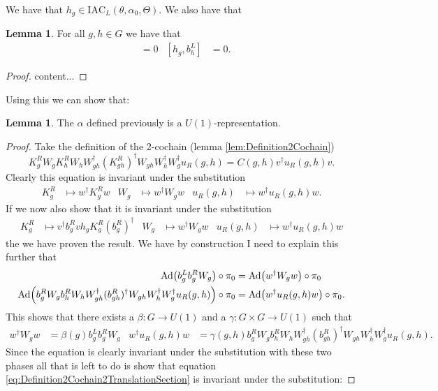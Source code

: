 \documentclass[12pt,a4paper,twoside]{article}
\let\originalleft\left
\let\originalright\right
\renewcommand{\left}{\mathopen{}\mathclose\bgroup\originalleft}
\renewcommand{\right}{\aftergroup\egroup\originalright}
\newcommand{\Ad}[1]{\textrm{Ad}\left(#1\right)}
\theoremstyle{definition}
\newtheorem{lemma}[theorem]{Lemma}
\numberwithin{equation}{section}
\begin{document}
We have that $h_g\in\textrm{IAC}_L(\theta,\alpha_0,\Theta)$. We also have that
\begin{lemma}\label{lem:W_g_And_h_g_Commute}
	For all $g,h\in G$ we have that
	\begin{align}
		[h_g,W_h]&=0&[h_g,b_h^L]&=0.
	\end{align}
\end{lemma}
\begin{proof}
	content...
\end{proof}
Using this we can show that:
\begin{lemma}
	The $\alpha$ defined previously is a $U(1)$-representation.
\end{lemma}
\begin{proof}
	Take the definition of the 2-cochain (lemma \ref{lem:Definition2Cochain})
	\begin{equation}\label{eq:Definition2Cochain2TranslationSection}
		K_g^RW_gK_h^RW_hW_{gh}^\dagger(K_{gh}^R)^\dagger W_{gh}W_{h}^\dagger W_g^\dagger u_R(g,h)=C(g,h)v^\dagger u_R(g,h)v.
	\end{equation}
	Clearly this equation is invariant under the substitution
	\begin{align}
		K_g^R&\mapsto w^\dagger K_g^R w&W_g&\mapsto w^\dagger W_g w&u_R(g,h)&\mapsto w^\dagger u_R(g,h)w.
	\end{align}
	If we now also show that it is invariant under the substitution
	\begin{align}
		K_g^R&\mapsto v^\dagger b_g^R v h_g K_g^R (b_g^R)^\dagger&W_g&\mapsto w^\dagger W_g w&u_R(g,h)&\mapsto w^\dagger u_R(g,h)w
	\end{align}
	the we have proven the result. We have by construction {\color{red}I need to explain this further} that
	\begin{align}
		\Ad{b_g^Lb_g^RW_g}\circ\pi_0&=\Ad{w^\dagger W_g w}\circ\pi_0\\
		\Ad{b_g^R W_g b_h^R W_h W_{gh}^\dagger (b_{gh}^R)^\dagger W_{gh}W_h^\dagger W_g^\dagger u_R(g,h)}\circ\pi_0&=\Ad{w^\dagger u_R(g,h) w}\circ\pi_0.
	\end{align}
	This shows that there exists a $\beta:G\rightarrow U(1)$ and a $\gamma:G\times G\rightarrow U(1)$ such that
	\begin{align}
		w^\dagger W_g w&=\beta(g)b_g^Lb_g^RW_g&w^\dagger u_R(g,h) w&=\gamma(g,h)b_g^R W_g b_h^R W_h W_{gh}^\dagger (b_{gh}^R)^\dagger W_{gh}W_h^\dagger W_g^\dagger u_R(g,h).
	\end{align}
	Since the equation is clearly invariant under the substitution with these two phases all that is left to do is show that equation \eqref{eq:Definition2Cochain2TranslationSection} is invariant under the substitution:

\end{proof}
\end{document}
